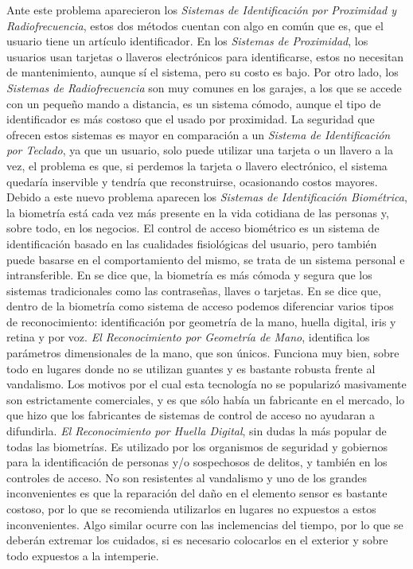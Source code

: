 \vskip 0.5cm
Ante este problema aparecieron los \textit{Sistemas de Identificación por Proximidad y Radiofrecuencia}, estos dos métodos cuentan con algo en común que es, que el usuario tiene un artículo identificador. En los \textit{Sistemas de Proximidad}, los usuarios usan tarjetas o llaveros electrónicos para identificarse, estos no necesitan de mantenimiento, aunque sí el sistema, pero su costo es bajo. Por otro lado, los \textit{Sistemas de Radiofrecuencia} son muy comunes en los garajes, a los que se accede con un pequeño mando a distancia, es un sistema cómodo, aunque el tipo de identificador es más costoso que el usado por proximidad. La seguridad que ofrecen estos sistemas es mayor en comparación a un \textit{Sistema de Identificación por Teclado}, ya que un usuario, solo puede utilizar una tarjeta o un llavero a la vez, el problema es que, si perdemos la tarjeta o llavero electrónico, el sistema quedaría inservible y tendría que reconstruirse, ocasionando costos mayores.
\vskip 0.5cm
Debido a este nuevo problema aparecen los \textit{Sistemas de Identificación Biométrica}, la biometría está cada vez más presente en la vida cotidiana de las personas y, sobre todo, en los negocios. El control de acceso biométrico es un sistema de identificación basado en las cualidades fisiológicas del usuario, pero también puede basarse en el comportamiento del mismo, se trata de un sistema personal e intransferible. En \cite{hugo} se dice que, la biometría es más cómoda y segura que los sistemas tradicionales como las contraseñas, llaves o tarjetas.
\vskip 0.5cm
En \cite{cosentino} se dice que, dentro de la biometría como sistema de acceso podemos diferenciar varios tipos de reconocimiento: identificación por geometría de la mano, huella digital, iris y retina y por voz.
\vskip 0.5cm
\textit{El Reconocimiento por Geometría de Mano}, identifica los parámetros dimensionales de la mano, que son únicos. Funciona muy bien, sobre todo en lugares donde no se utilizan guantes y es bastante robusta frente al vandalismo. Los motivos por el cual esta tecnología no se popularizó masivamente son estrictamente comerciales, y es que sólo había un fabricante en el mercado, lo que hizo que los fabricantes de sistemas de control de acceso no ayudaran a difundirla.
\vskip 0.5cm
\textit{El Reconocimiento por Huella Digital}, sin dudas la más popular de todas las biometrías. Es utilizado por los organismos de seguridad y gobiernos para la identificación de personas y/o sospechosos de delitos, y también en los controles de acceso. No son resistentes al vandalismo y uno de los grandes inconvenientes es que la reparación del daño en el elemento sensor es bastante costoso, por lo que se recomienda utilizarlos en lugares no expuestos a estos inconvenientes. Algo similar ocurre con las inclemencias del tiempo, por lo que se deberán extremar los cuidados, si es necesario colocarlos en el exterior y sobre todo expuestos a la intemperie.
